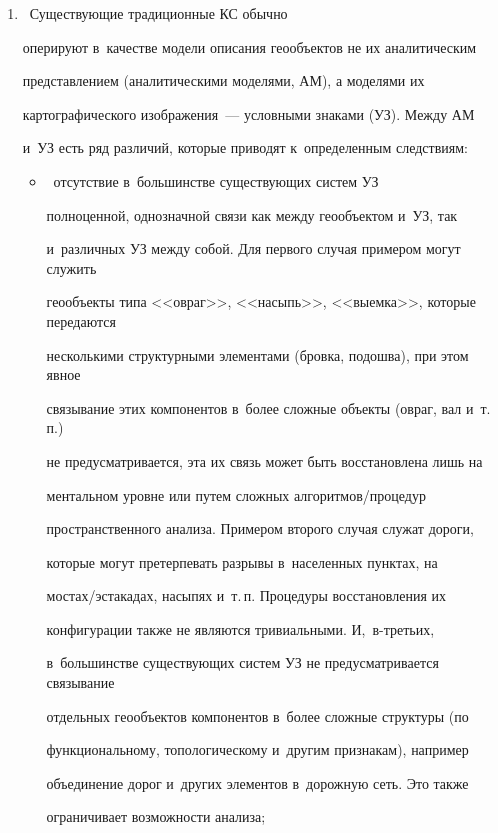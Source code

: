   \begin{enumerate}[1.]


  \item ~Существующие традиционные КС обычно 


оперируют в~качестве модели описания геообъектов не их аналитическим 


представлением (аналитическими моделями, АМ), а моделями их 


картографического изображения~--- условными знаками (УЗ). Между АМ 


и~УЗ есть ряд различий, которые приводят к~определенным следствиям:


  \begin{itemize}


  \item[(а)]~отсутствие в~большинстве существующих систем УЗ 


полноценной, однозначной связи как между геообъектом и~УЗ, так 


и~различных УЗ между собой. Для первого случая примером могут служить 


геообъекты типа <<овраг>>, <<насыпь>>, <<выемка>>, которые передаются 


несколькими структурными элементами (бровка, подошва), при этом явное 


связывание этих компонентов в~более сложные объекты (овраг, вал и~т.\,п.)\ 


не предусматривается, эта их связь может быть восстановлена лишь на 


ментальном уровне или путем сложных алгоритмов\!/\!процедур 


пространственного анализа. Примером второго случая служат дороги, 


которые могут претерпевать разрывы в~населенных пунктах, на 


мостах\!/\!эстакадах, насыпях и~т.\,п. Процедуры восстановления их 


конфигурации также не являются тривиальными. И,~в-третьих, 


в~большинстве существующих систем УЗ не предусматривается связывание 


отдельных геообъектов компонентов в~более сложные структуры (по 


функциональному, топологическому и~другим признакам), например 


объединение дорог и~других элементов в~дорожную сеть. Это также 


ограничивает возможности анализа;



\end{itemize}
\end{enumerate}
